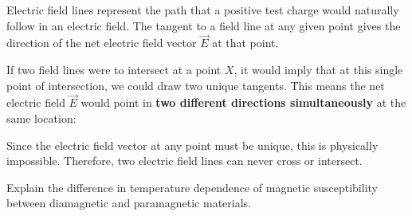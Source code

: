 \documentclass[11pt,a4paper]{article}
\begin{document}
\begin{solutionbox}
    Electric field lines represent the path that a positive test charge would naturally follow in an electric field. The tangent to a field line at any given point gives the direction of the net electric field vector $\vec{E}$ at that point.
    
    If two field lines were to intersect at a point $X$, it would imply that at this single point of intersection, we could draw two unique tangents. This means the net electric field $\vec{E}$ would point in \textbf{two different directions simultaneously} at the same location:
    \begin{center}
    \end{center}
    Since the electric field vector at any point must be unique, this is physically impossible. Therefore, two electric field lines can never cross or intersect.
\end{solutionbox}

\vspace{0.8cm}

\begin{questionbox}
    Explain the difference in temperature dependence of magnetic susceptibility between diamagnetic and paramagnetic materials.
\end{questionbox}
\end{document}
